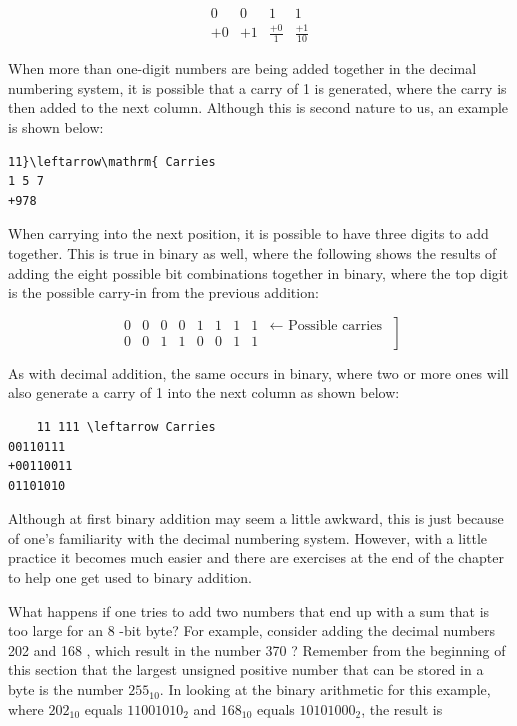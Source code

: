 \documentclass[10pt]{book}
\begin{document}
$$
\begin{array}{rrrr}
0 & 0 & 1 & 1 \\
+0 & +1 & \frac{+0}{1} & \frac{+1}{10}
\end{array}
$$

When more than one-digit numbers are being added together in the decimal numbering system, it is possible that a carry of 1 is generated, where the carry is then added to the next column. Although this is second nature to us, an example is shown below:

\begin{verbatim}
11}\leftarrow\mathrm{ Carries
1 5 7
+978
\end{verbatim}

When carrying into the next position, it is possible to have three digits to add together. This is true in binary as well, where the following shows the results of adding the eight possible bit combinations together in binary, where the top digit is the possible carry-in from the previous addition:

$$
\left.\begin{array}{rrrrrrrrr}
0 & 0 & 0 & 0 & 1 & 1 & 1 & 1 & \leftarrow \text { Possible carries } \\
0 & 0 & 1 & 1 & 0 & 0 & 1 & 1
\end{array}\right]
$$

As with decimal addition, the same occurs in binary, where two or more ones will also generate a carry of 1 into the next column as shown below:

\begin{verbatim}
    11 111 \leftarrow Carries
00110111
+00110011
01101010
\end{verbatim}

Although at first binary addition may seem a little awkward, this is just because of one's familiarity with the decimal numbering system. However, with a little practice it becomes much easier and there are exercises at the end of the chapter to help one get used to binary addition.

What happens if one tries to add two numbers that end up with a sum that is too large for an 8 -bit byte? For example, consider adding the decimal numbers 202 and 168 , which result in the number 370 ? Remember from the beginning of this section that the largest unsigned positive number that can be stored in a byte is the number $255_{10}$. In looking at the binary arithmetic for this example, where $202_{10}$ equals $11001010_{2}$ and $168_{10}$ equals $10101000_{2}$, the result is
\end{document}
